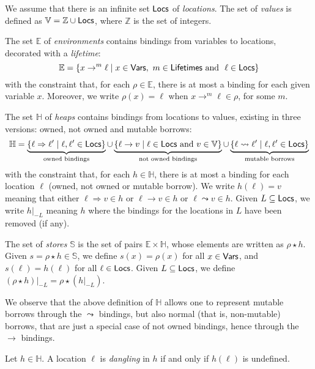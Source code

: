 \begin{definition}
  We assume that there is an infinite set $\mathsf{Locs}$ of \emph{locations}.
  The set of \emph{values} is defined as $\mathbb{V}=\mathbb{Z}\cup\mathsf{Locs}$,
  where $\mathbb{Z}$ is the set of integers.

  The set $\mathbb{E}$
  of \emph{environments} contains bindings from variables to locations,
  decorated with a \emph{lifetime}:
  \[
  \mathbb{E}=\{x\to^m\ell\mid x\in\Vars,\ m\in\Lifetimes\text{ and }\ \ell\in\Locs\}
  \]
  with the constraint that, for each $\rho\in\mathbb{E}$, there is at most a binding for each
  given variable $x$. Moreover, we write $\rho(x)=\ell$ when
  $x\rightarrow^m\ell\in\rho$, for some $m$.

  The set $\mathbb{H}$ of \emph{heaps} contains bindings from locations to values,
  existing in three versions: owned, not owned and mutable borrows:
  \[
  \mathbb{H}=
  \underbrace{\{\ell\Rightarrow\ell'\mid\ell,\ell'\in\mathsf{Locs}\}}_{\text{owned bindings}}
  \cup
  \underbrace{\{\ell\rightarrow v\mid\ell\in\mathsf{Locs}\text{ and }v\in\mathbb{V}\}}_{\text{not owned bindings}}
  \cup
  \underbrace{\{\ell\leadsto\ell'\mid\ell,\ell'\in\mathsf{Locs}\}}_{\text{mutable borrows}}
  \]
  with the constraint that, for each $h\in\mathbb{H}$, there is at most a binding for each
  location $\ell$ (owned, not owned or mutable borrow). We write $h(\ell)=v$ meaning that
  either $\ell\Rightarrow v\in h$ or $\ell\rightarrow v\in h$ or $\ell\leadsto v\in h$.
  Given $L\subseteq\mathsf{Locs}$,
  we write $h|_{-L}$ meaning $h$ where the bindings for the locations in $L$
  have been removed (if any).

  The set of \emph{stores} $\mathbb{S}$ is the set of pairs
  $\mathbb{E}\times\mathbb{H}$, whose elements are written as $\rho\star h$.
  Given $s=\rho\star h\in\mathbb{S}$, we define $s(x)=\rho(x)$ for all
  $x\in\mathsf{Vars}$, and $s(\ell)=h(\ell)$ for all $\ell\in\mathsf{Locs}$.
  Given $L\subseteq\mathsf{Locs}$, we define $(\rho\star h)|_{-L}=\rho\star(h|_{-L})$.
\end{definition}

\noindent
We observe that the above definition of $\mathbb{H}$ allows one to represent mutable borrows
through the $\leadsto$ bindings, but also normal (that is, non-mutable) borrows, that are
just a special case of not owned bindings, hence through the $\to$ bindings.

\begin{definition}
  Let $h\in\mathbb{H}$. A location $\ell$ is \emph{dangling} in $h$ if
  and only if $h(\ell)$ is undefined.
\end{definition}

